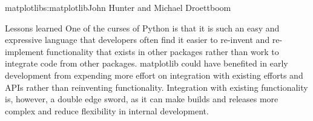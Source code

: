 \begin{aosachapter}{matplotlib}{s:matplotlib}{John Hunter and Michael Droettboom}
\begin{aosasect1}{Lessons learned}
One of the curses of Python is that it is such an easy and expressive
language that developers often find it easier to re-invent and
re-implement functionality that exists in other packages rather than
work to integrate code from other packages.  matplotlib could have
benefited in early development from expending more effort on
integration with existing efforts and APIs rather than reinventing
functionality.  Integration with existing functionality is, however, a
double edge sword, as it can make builds and releases more complex and
reduce flexibility in internal development.

\end{aosasect1}
\end{aosachapter}
